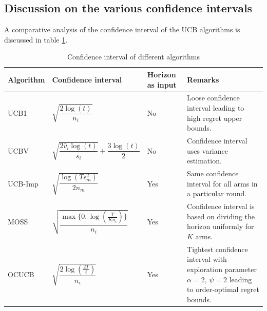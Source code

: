\subsection{Discussion on the various confidence intervals}

A comparative analysis of the confidence interval of the UCB algorithms is discussed in table \ref{tab:conf-comp}.

\begin{table}[!ht]
\caption{Confidence interval of different algorithms}
\label{tab:conf-comp}
\begin{center}
\begin{tabular}{|p{5em}|p{10em}|p{4em}|p{12em}|}
\hline
Algorithm  &  Confidence interval & Horizon as input & Remarks \\
\hline
\hline
UCB1        & $\sqrt{\dfrac{2\log (t)}{n_i}}$ & No & Loose confidence interval leading to high regret upper bounds.\\%
\hline
\hline
UCBV        & $\sqrt{\dfrac{2\hat{v}_i\log (t)}{s_i}} + \dfrac{3\log (t)}{2}$ & No & Confidence interval uses variance estimation.\\
\hline
\hline
UCB-Imp 		& $\sqrt{\dfrac{\log{( T\epsilon_{m}^{2})}}{2 n_{m}}}$ & Yes & Same confidence interval for all arms in a particular round.\\%
\hline
\hline
MOSS	     	& $\sqrt{\dfrac{\max\lbrace 0,\log(\frac{T}{K n_i})\rbrace}{n_i}}$ & Yes & Confidence interval is based on dividing the horizon uniformly for $K$ arms.\\%
\hline
\hline
OCUCB     	& $\sqrt{\dfrac{2\log(\frac{2T}{t})}{n_i}}$ & Yes & Tightest confidence interval with exploration parameter $\alpha=2$, $\psi=2$ leading to order-optimal regret bounds.\\\midrule
\end{tabular}
\end{center}
\end{table} 